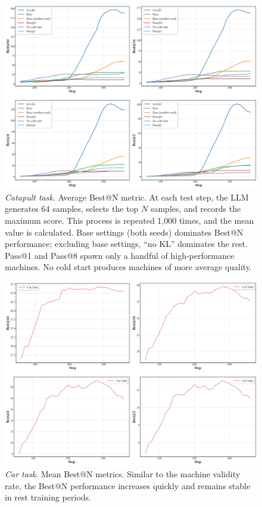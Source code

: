 \begin{figure}[h!]
  \centering
  \includegraphics[width=\linewidth]{figures/RL_Metrics/Catapult/Val_Best.png}
  \caption{\footnotesize \textit{Catapult task}. Average Best@N metric. At each test step, the LLM generates 64 samples, selects the top $N$ samples, and records the maximum score. This process is repeated 1,000 times, and the mean value is calculated. Base settings (both seeds) dominates Best@N performance; excluding base settings, ``no KL'' dominates the rest. Pass@1 and Pass@8 spawn only a handful of high-performance machines. No cold start produces machines of more average quality.}
  \label{fig:RL-catapult-best@n}
\end{figure}

\begin{figure}[h!]
  \centering
  \includegraphics[width=\linewidth]{figures/RL_Metrics/Car/Val_Best.png}
  \caption{\footnotesize \textit{Car task}. Mean Best@N metrics. Similar to the machine validity rate, the Best@N performance increases quickly and remains stable in rest training periods.}\label{fig:RL-car-best@n}
\end{figure}


